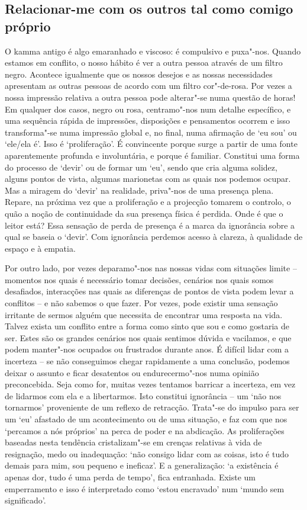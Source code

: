 \subsection{Relacionar-me com os outros tal como comigo próprio}

O kamma antigo é algo emaranhado e viscoso: é compulsivo e puxa"-nos. Quando
estamos em conflito, o nosso hábito é ver a outra pessoa através de um filtro
negro. Acontece igualmente que os nossos desejos e as nossas necessidades
apresentam as outras pessoas de acordo com um filtro cor"-de-rosa. Por vezes a
nossa impressão relativa a outra pessoa pode alterar"-se numa questão de horas!
Em qualquer dos casos, negro ou rosa, centramo"-nos num detalhe específico, e
uma sequência rápida de impressões, disposições e pensamentos ocorrem e isso
transforma"-se numa impressão global e, no final, numa afirmação de `eu sou' ou
`ele/ela é'. Isso é `proliferação'. É convincente porque surge a partir de uma
fonte aparentemente profunda e involuntária, e porque é familiar. Constitui uma
forma do processo de `devir' ou de formar um `eu', sendo que cria alguma
solidez, alguns pontos de vista, algumas marionetas com as quais nos podemos
ocupar. Mas a miragem do `devir' na realidade, priva"-nos de uma presença plena.
Repare, na próxima vez que a proliferação e a projecção tomarem o controlo, o
quão a noção de continuidade da sua presença física é perdida. Onde é que o
leitor está? Essa sensação de perda de presença é a marca da ignorância sobre a
qual se baseia o `devir'. Com ignorância perdemos acesso à clareza, à qualidade
de espaço e à empatia.

Por outro lado, por vezes deparamo"-nos nas nossas vidas com situações limite --
momentos nos quais é necessário tomar decisões, cenários nos quais somos
desafiados, interacções nas quais as diferenças de pontos de vista podem levar a
conflitos -- e não sabemos o que fazer. Por vezes, pode existir uma sensação
irritante de sermos alguém que necessita de encontrar uma resposta na vida.
Talvez exista um conflito entre a forma como sinto que sou e como gostaria de
ser. Estes são os grandes cenários nos quais sentimos dúvida e vacilamos, e que
podem manter"-nos ocupados ou frustrados durante anos. É difícil lidar com a
incerteza -- se não conseguimos chegar rapidamente a uma conclusão, podemos
deixar o assunto e ficar desatentos ou endurecermo"-nos numa opinião
preconcebida. Seja como for, muitas vezes tentamos barricar a incerteza, em vez
de lidarmos com ela e a libertarmos. Isto constitui ignorância -- um `não nos
tornarmos' proveniente de um reflexo de retracção. Trata"-se do impulso para ser
um `eu' afastado de um acontecimento ou de uma situação, e faz com que nos
`percamos a nós próprios' na perca de poder e na abdicação. As proliferações
baseadas nesta tendência cristalizam"-se em crenças relativas à vida de
resignação, medo ou inadequação: `não consigo lidar com as coisas, isto é tudo
demais para mim, sou pequeno e ineficaz'. E a generalização: `a existência é
apenas dor, tudo é uma perda de tempo', fica entranhada. Existe um emperramento
e isso é interpretado como `estou encravado' num `mundo sem significado'.

